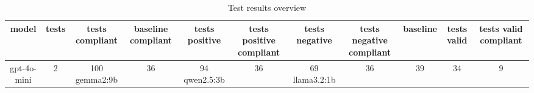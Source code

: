 
  \begin{table}[h!]
  \centering
  \begin{tabular}{|c|c|c|c|c|c|c|c|c|c|c|}
  \hline
  model & tests & tests compliant & baseline compliant & tests positive & tests positive compliant & tests negative & tests negative compliant & baseline & tests valid & tests valid compliant \\
  \hline
  gpt-4o-mini & 2 & 100%
\hline
gemma2:9b & 36 & 94%
\hline
qwen2.5:3b & 36 & 69%
\hline
llama3.2:1b & 36 & 39%
\hline
 & 34 & 9%
  \end{tabular}
  \caption{Test results overview}
  
  \end{table}
  